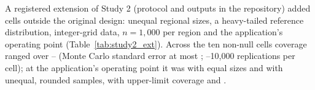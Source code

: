 \documentclass[AMA,Times1COL]{WileyNJDv5}
\begin{document}
A registered extension of Study 2 (protocol and outputs in the repository) added cells outside the original design: unequal regional sizes, a heavy-tailed reference distribution, integer-grid data, $n = 1{,}000$ per region and the application's operating point (Table~\ref{tab:study2_ext}). Across the ten non-null cells coverage ranged over -- (Monte Carlo standard error at most ; --10{,}000 replications per cell); at the application's operating point it was  with equal sizes and  with unequal, rounded samples, with upper-limit coverage  and .
\end{document}
